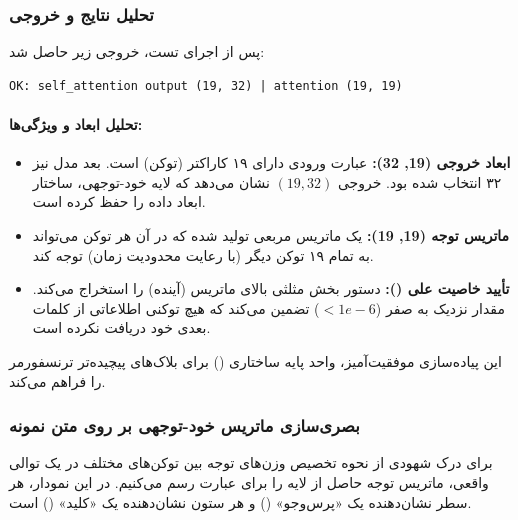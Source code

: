 \documentclass{article}
\begin{document}
\subsubsection*{تحلیل نتایج و خروجی}

پس از اجرای تست، خروجی زیر حاصل شد:
\begin{latin}
	\begin{lstlisting}[basicstyle=\ttfamily\small, frame=single]
		OK: self_attention output (19, 32) | attention (19, 19)
	\end{lstlisting}
\end{latin}

\paragraph{تحلیل ابعاد و ویژگی‌ها:}
\begin{itemize}
	\item \textbf{ابعاد خروجی (19, 32):} عبارت ورودی دارای ۱۹ کاراکتر (توکن) است. بعد مدل نیز ۳۲ انتخاب شده بود. خروجی $(19, 32)$ نشان می‌دهد که لایه خود-توجهی، ساختار ابعاد داده را حفظ کرده است.
	\item \textbf{ماتریس توجه (19, 19):} یک ماتریس مربعی تولید شده که در آن هر توکن می‌تواند به تمام ۱۹ توکن دیگر (با رعایت محدودیت زمان) توجه کند.
	\item \textbf{تأیید خاصیت علی ():} دستور  بخش مثلثی بالای ماتریس (آینده) را استخراج می‌کند. مقدار  نزدیک به صفر ($< 1e-6$) تضمین می‌کند که هیچ توکنی اطلاعاتی از کلمات بعدی خود دریافت نکرده است.
\end{itemize}

این پیاده‌سازی موفقیت‌آمیز، واحد پایه ساختاری () برای بلاک‌های پیچیده‌تر ترنسفورمر را فراهم می‌کند.

\subsubsection*{بصری‌سازی ماتریس خود-توجهی بر روی متن نمونه}

برای درک شهودی از نحوه تخصیص وزن‌های توجه بین توکن‌های مختلف در یک توالی واقعی، ماتریس توجه حاصل از لایه  را برای عبارت  رسم می‌کنیم. در این نمودار، هر سطر نشان‌دهنده یک «پرس‌وجو» () و هر ستون نشان‌دهنده یک «کلید» () است.
\end{document}
